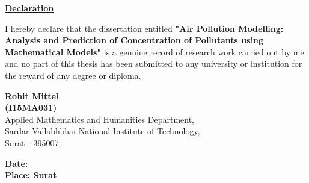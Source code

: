 \documentclass{report}
\begin{document}
\begin{center}
\textbf{\underline{{\LARGE Declaration}}} \\
\end{center}

\vspace{0.5cm}

   {\large I hereby declare that the dissertation entitled \textbf{"Air Pollution Modelling: Analysis and Prediction of Concentration of Pollutants using Mathematical Models"} is a genuine record of research work carried out by me and no part of this thesis has been submitted to any university or institution for the reward of any degree or diploma.}
  
  \vspace{5cm}
  
  \begin{flushleft}
   
   	\vspace{3cm}
   
   		\begin{Large}
   		 \textbf{Rohit Mittel} \\
   		 \textbf{(I15MA031)} \\
   		Applied Mathematics and Humanities Department, \\
   		Sardar Vallabhbhai National Institute of Technology, \\
   		Surat - 395007. \\
   		
\vspace{2cm}   		
   		
   		\textbf{Date: } \\
   		\textbf{Place: Surat}
   		 \end{Large} \\
   \end{flushleft}
\end{document}

